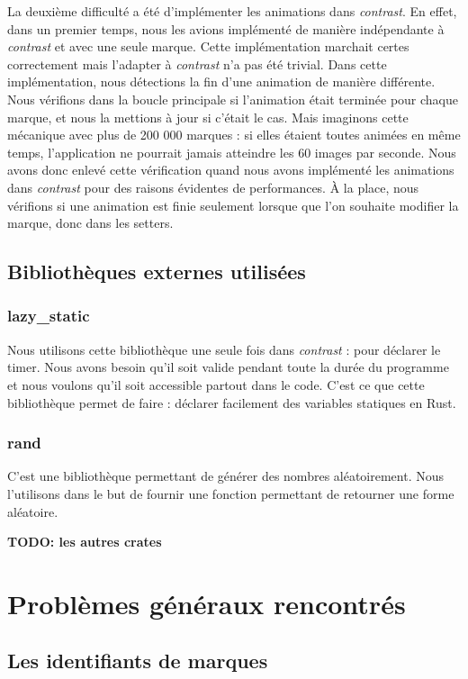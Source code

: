 \documentclass[12pt]{article}
\begin{document}
La deuxième difficulté a été d'implémenter les animations dans \textit{contrast}.
En effet, dans un premier temps, nous les avions implémenté de manière indépendante à \textit{contrast} et avec une seule marque. Cette implémentation marchait certes correctement mais l'adapter à \textit{contrast} n'a pas été trivial.
Dans cette implémentation, nous détections la fin d'une animation de manière différente. Nous vérifions
dans la boucle principale si l'animation était terminée pour chaque marque, et nous la mettions à jour si
c'était le cas.
Mais imaginons cette mécanique avec plus de 200 000 marques : si elles étaient toutes animées en même
temps, l'application ne pourrait jamais atteindre les 60 images par seconde.
Nous avons donc enlevé cette vérification quand nous avons implémenté les animations dans \textit{contrast}
pour des raisons évidentes de performances.
À la place, nous vérifions si une animation est finie seulement lorsque que l'on souhaite modifier la
marque, donc dans les setters.

\subsection{Bibliothèques externes utilisées}
\subsubsection{lazy\_static}
Nous utilisons cette bibliothèque \cite{lazy-static} une seule fois dans
\textit{contrast} : pour déclarer le timer. Nous avons besoin qu'il soit valide pendant
toute la durée du programme et nous voulons qu'il soit accessible partout dans le code.
C'est ce que cette bibliothèque permet de faire : déclarer facilement des variables
statiques en Rust.

\subsubsection{rand}
C'est une bibliothèque \cite{rand} permettant de générer des nombres aléatoirement. Nous
l'utilisons dans le but de fournir une fonction permettant de retourner une forme
aléatoire.

\textbf{TODO: les autres crates}

\section{Problèmes généraux rencontrés}
\subsection{Les identifiants de marques}
\end{document}
